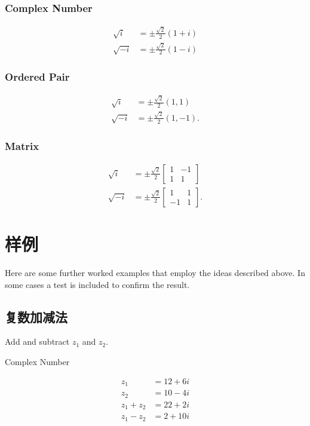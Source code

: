 \subsubsection{Complex Number}
$$
\begin{aligned}
\sqrt{i} & = \pm \frac{\sqrt{2}}{2}(1+i) \\
\sqrt{-i} & = \pm \frac{\sqrt{2}}{2}(1-i)
\end{aligned}
$$

\subsubsection{Ordered Pair}
$$
\begin{aligned}
\sqrt{i} & = \pm \frac{\sqrt{2}}{2}(1,1) \\
\sqrt{-i} & = \pm \frac{\sqrt{2}}{2}(1,-1) .
\end{aligned}
$$

\subsubsection{Matrix}
$$
\begin{aligned}
\sqrt{i} & = \pm \frac{\sqrt{2}}{2}\left[\begin{array}{cc}
1 & -1 \\
1 & 1
\end{array}\right] \\
\sqrt{-i} & = \pm \frac{\sqrt{2}}{2}\left[\begin{array}{cc}
1 & 1 \\
-1 & 1
\end{array}\right] .
\end{aligned}
$$

\section{样例}
Here are some further worked examples that employ the ideas described above. In some cases a test is included to confirm the result.

\subsection{复数加减法}
Add and subtract $z_{1}$ and $z_{2}$.

Complex Number

$$
\begin{aligned}
z_{1} & =12+6 i \\
z_{2} & =10-4 i \\
z_{1}+z_{2} & =22+2 i \\
z_{1}-z_{2} & =2+10 i
\end{aligned}
$$

